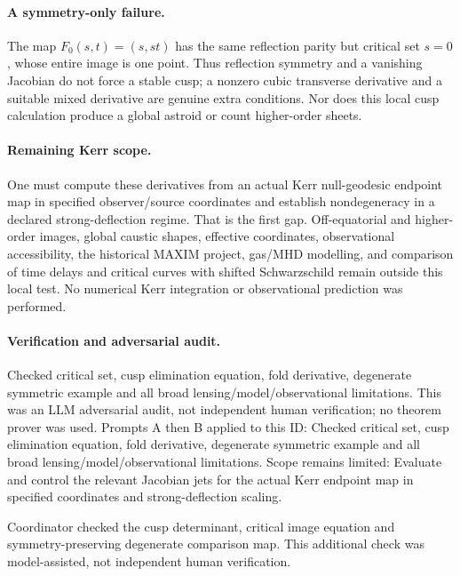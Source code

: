 \documentclass[11pt]{article}
\begin{document}
\paragraph{A symmetry-only failure.}The map \(F_0(s,t)=(s,st)\) has the same reflection parity but critical set \(s=0\), whose entire image is one point. Thus reflection symmetry and a vanishing Jacobian do not force a stable cusp; a nonzero cubic transverse derivative and a suitable mixed derivative are genuine extra conditions. Nor does this local cusp calculation produce a global astroid or count higher-order sheets.
\paragraph{Remaining Kerr scope.}One must compute these derivatives from an actual Kerr null-geodesic endpoint map in specified observer/source coordinates and establish nondegeneracy in a declared strong-deflection regime. That is the first gap. Off-equatorial and higher-order images, global caustic shapes, effective coordinates, observational accessibility, the historical MAXIM project, gas/MHD modelling, and comparison of time delays and critical curves with shifted Schwarzschild remain outside this local test. No numerical Kerr integration or observational prediction was performed.

\paragraph{Verification and adversarial audit.}
Checked critical set, cusp elimination equation, fold derivative, degenerate symmetric example and all broad lensing/model/observational limitations. This was an LLM adversarial audit, not independent human verification; no theorem prover was used. Prompts A then B applied to this ID: Checked critical set, cusp elimination equation, fold derivative, degenerate symmetric example and all broad lensing/model/observational limitations. Scope remains limited: Evaluate and control the relevant Jacobian jets for the actual Kerr endpoint map in specified coordinates and strong-deflection scaling.

Coordinator checked the cusp determinant, critical image equation and symmetry-preserving degenerate comparison map. This additional check was model-assisted, not independent human verification.
\end{document}
